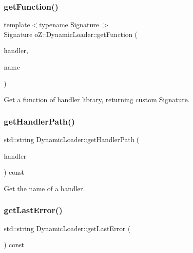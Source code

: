 \subsubsection{\texorpdfstring{getFunction()}{getFunction()}\hspace{0.1cm}{\footnotesize\ttfamily [2/2]}}
{\footnotesize\ttfamily template$<$typename Signature $>$ \\
Signature o\+Z\+::\+Dynamic\+Loader\+::get\+Function (\begin{DoxyParamCaption}\item[{\mbox{\hyperlink{namespaceo_z_a4f8ae5685d0f7dca498d73129b482f2d}{Dynamic\+Handler}}}]{handler,  }\item[{const std\+::string \&}]{name }\end{DoxyParamCaption})\hspace{0.3cm}{\ttfamily [inline]}}



Get a function of handler library, returning custom Signature. 

\mbox{\label{classo_z_1_1_dynamic_loader_a732fb1a8c82a4caa1a5e3a227b9d32ab}} 
\subsubsection{\texorpdfstring{getHandlerPath()}{getHandlerPath()}}
{\footnotesize\ttfamily std\+::string Dynamic\+Loader\+::get\+Handler\+Path (\begin{DoxyParamCaption}\item[{const \mbox{\hyperlink{namespaceo_z_a4f8ae5685d0f7dca498d73129b482f2d}{Dynamic\+Handler}}}]{handler }\end{DoxyParamCaption}) const\hspace{0.3cm}{\ttfamily [noexcept]}}



Get the name of a handler. 

\mbox{\label{classo_z_1_1_dynamic_loader_ae822f62c912bfdc978188d22e45798ff}} 
\subsubsection{\texorpdfstring{getLastError()}{getLastError()}}
{\footnotesize\ttfamily std\+::string Dynamic\+Loader\+::get\+Last\+Error (\begin{DoxyParamCaption}\item[{void}]{ }\end{DoxyParamCaption}) const\hspace{0.3cm}{\ttfamily [noexcept]}}



